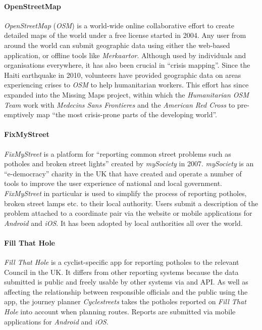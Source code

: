 \documentclass{article}
\begin{document}
		\paragraph{OpenStreetMap}
		\emph{OpenStreetMap} (\emph{OSM}) is a world-wide online collaborative effort to create detailed maps of the world under a free\cite{_open_2012} license started in 2004. Any user from around the world can submit geographic data using either the web-based application, or offline tools like \emph{Merkaartor}. Although used by individuals and organisations everywhere, it has also been crucial in ``crisis mapping''. Since the Haiti earthquake in 2010, volunteers have provided geographic data on areas experiencing crises to \emph{OSM} to help humanitarian workers\cite{_our_????}. This effort has since expanded into the Missing Maps project, within which the \emph{Humanitarian OSM Team} work with \emph{Medecins Sans Frontieres} and the \emph{American Red Cross} to pre-emptively map ``the most crisis-prone parts of the developing world''\cite{_missing_????}.

		\paragraph{FixMyStreet}
		\emph{FixMyStreet} is a platform for ``reporting common street problems such as potholes and broken street lights''\cite{_mysociety/fixmystreet_2015} created by \emph{mySociety} in 2007. \emph{mySociety} is an ``e-democracy'' charity in the UK that have created and operate a number of tools to improve the user experience of national and local government. \emph{FixMyStreet} in particular is used to simplify the process of reporting potholes, broken street lamps etc. to their local authority. Users submit a description of the problem attached to a coordinate pair via the website or mobile applications for \emph{Android} and \emph{iOS}. It has been adopted by local authorities all over the world.

		\paragraph{Fill That Hole}
		\emph{Fill That Hole}\cite{_fill_????} is a cyclist-specific app for reporting potholes to the relevant Council in the UK. It differs from other reporting systems because the data submitted is public and freely usable by other systems via and API. As well as affecting the relationship between responsible officials and the public using the app\cite{erickson_geocentric_2010}, the journey planner \emph{Cyclestreets} takes the potholes reported on \emph{Fill That Hole} into account when planning routes. Reports are submitted via mobile applications for \emph{Android} and \emph{iOS}.
\end{document}
